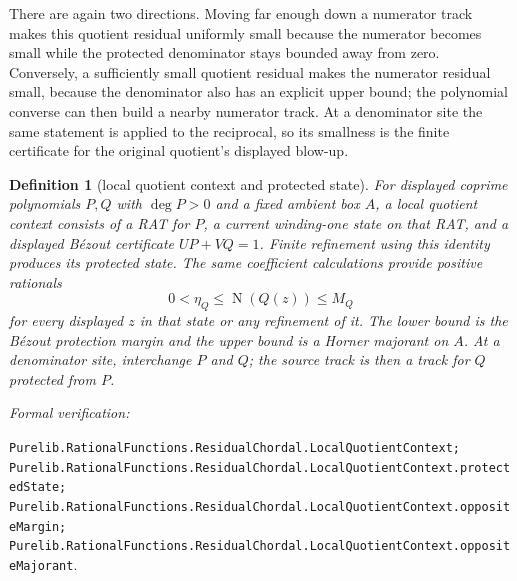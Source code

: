 \documentclass[11pt]{article}
\newtheorem{definition}[theorem]{Definition}
\newcommand{\Norm}[1]{\operatorname{N}\!\left(#1\right)}
\newcommand{\leanref}[1]{\par\smallskip\noindent
  \emph{Formal verification:}\par\nobreak
  {\raggedright\nolinkurl{#1}.\par}}
\begin{document}
There are again two directions.  Moving far enough down a numerator track
makes this quotient residual uniformly small because the numerator becomes
small while the protected denominator stays bounded away from zero.
Conversely, a sufficiently small quotient residual makes the numerator
residual small, because the denominator also has an explicit upper bound; the
polynomial converse can then build a nearby numerator track.  At a denominator
site the same statement is applied to the reciprocal, so its smallness is the
finite certificate for the original quotient's displayed blow-up.

\begin{definition}[local quotient context and protected state]
\label{def:protected-quotient-state}
For displayed coprime polynomials $P,Q$ with $\deg P>0$ and a fixed ambient
box $A$, a \emph{local quotient context} consists of a RAT for $P$, a current
winding-one state on that RAT, and a displayed Bézout certificate
$UP+VQ=1$.  Finite refinement using this identity produces its
\emph{protected state}.  The same coefficient calculations provide positive
rationals
\[
  0<\eta_Q\le\Norm{Q(z)}\le M_Q
\]
for every displayed $z$ in that state or any refinement of it.  The lower
bound is the Bézout protection margin and the upper bound is a Horner
majorant on $A$.  At a denominator site, interchange $P$ and $Q$; the source
track is then a track for $Q$ protected from $P$.
\end{definition}

\leanref{Purelib.RationalFunctions.ResidualChordal.LocalQuotientContext;
Purelib.RationalFunctions.ResidualChordal.LocalQuotientContext.protectedState;
Purelib.RationalFunctions.ResidualChordal.LocalQuotientContext.oppositeMargin;
Purelib.RationalFunctions.ResidualChordal.LocalQuotientContext.oppositeMajorant}
\end{document}
